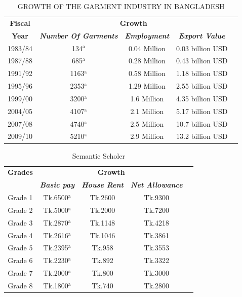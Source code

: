 \documentclass[conference]{IEEEtran}
\begin{document}
\begin{table}[htbp]
\caption{GROWTH OF THE GARMENT INDUSTRY IN BANGLADESH}
\begin{center}
\begin{tabular}{|c|c|c|c|c|}
\hline
\textbf{Fiscal}&\multicolumn{3}{|c|}{\textbf{Growth}} \\
\cline{2-4} 
\textbf{Year} & \textbf{\textit{Number Of Garments}}& \textbf{\textit{Employment}}& \textbf{\textit{Export Value }} \\
\hline
1983/84 & 134$^{\mathrm{a}}$& 0.04 Million & 0.03 billion USD \\
1987/88 & 685$^{\mathrm{a}}$& 0.28 Million & 0.43 billion USD\\
1991/92 & 1163$^{\mathrm{a}}$& 0.58 Million &  1.18 billion USD\\
1995/96 & 2353$^{\mathrm{a}}$& 1.29 Million &  2.55 billion USD\\
1999/00 & 3200$^{\mathrm{a}}$& 1.6 Million &  4.35 billion USD\\
2004/05 & 4107$^{\mathrm{a}}$& 2.1 Million &   5.17 billion USD\\
2007/08 & 4740$^{\mathrm{a}}$& 2.5 Million &  10.7 billion USD\\
2009/10 & 5210$^{\mathrm{a}}$& 2.9 Million &  13.2 billion USD\\
\hline
\end{tabular}
\label{tab1}
\end{center}
\end{table}

\begin{table}[htbp]
\caption{Semantic Scholer}
\begin{center}
\begin{tabular}{|c|c|c|c|c|}
\hline
\textbf{Grades}&\multicolumn{3}{|c|}{\textbf{Growth}} \\
\cline{2-4} 
\textbf{} & \textbf{\textit{Basic pay}}& \textbf{\textit{House Rent}}& \textbf{\textit{Net Allowance}} \\
\hline
Grade 1 & Tk.6500$^{\mathrm{a}}$&  Tk.2600 & Tk.9300 \\
Grade 2 & Tk.5000$^{\mathrm{a}}$&  Tk.2000 & Tk.7200\\
Grade 3 &  Tk.2870$^{\mathrm{a}}$&  Tk.1148 &  Tk.4218\\
Grade 4 &  Tk.2616$^{\mathrm{a}}$&  Tk.1046 &  Tk.3861\\
Grade 5 &  Tk.2395$^{\mathrm{a}}$& Tk.958 &  Tk.3553\\
Grade 6 &  Tk.2230$^{\mathrm{a}}$& Tk.892 &   Tk.3322\\
Grade 7 &  Tk.2000$^{\mathrm{a}}$& Tk.800 &  Tk.3000\\
Grade 8 &  Tk.1800$^{\mathrm{a}}$& Tk.740 &  Tk.2800\\
\hline
\end{tabular}
\label{tab1}
\end{center}
\end{table}
\end{document}
